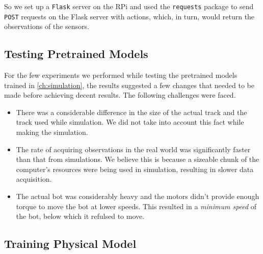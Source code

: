 \documentclass[12pt]{extreport}
\begin{document}
So we set up a \texttt{Flask} server on the RPi and used the \texttt{requests} package to send \texttt{POST} requests on the Flask server with actions, which, in turn, would return the observations of the sensors.

\subsection{Testing Pretrained Models} \label{sec:testpretrainedmodels}
For the few experiments we performed while testing the pretrained models trained in \autoref{ch:simulation}, the results suggested a few changes that needed to be made before achieving decent results. The following challenges were faced.

\begin{itemize}
 \item There was a considerable difference in the size of the actual track and the track used while simulation. We did not take into account this fact while making the simulation.
 \item The rate of acquiring observations in the real world was significantly faster than that from simulations. We believe this is because a sizeable chunk of the computer's resources were being used in simulation, resulting in slower data acquisition.
 \item The actual bot was considerably heavy and the motors didn't provide enough torque to move the bot at lower speeds. This resulted in a \emph{minimum speed} of the bot, below which it refulsed to move.
\end{itemize}

\subsection{Training Physical Model}



\end{document}
